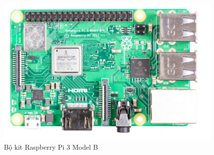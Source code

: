 \begin{figure}[H]
    \centering
    \includegraphics[width=0.75\linewidth]{images/rpi3.png}
    \caption{Bộ kit Raspberry Pi 3 Model B}
\end{figure}